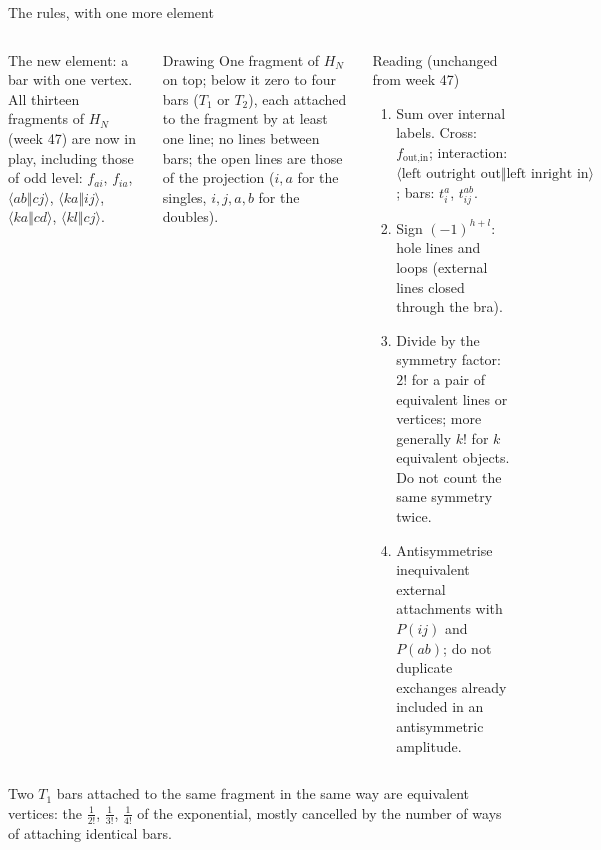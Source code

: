 \documentclass[aspectratio=169,10pt]{beamer}
\newcommand{\as}[4]{\langle #1#2\Vert #3#4\rangle}
\begin{document}
\begin{frame}[shrink=1]{The rules, with one more element}
\footnotesize
\begin{columns}[T]
\centering
{}
\hspace{1em}

\vspace{0.8em}
\raggedright\footnotesize The new element: a bar with one vertex. All thirteen fragments of $H_N$ (week 47) are now in play, including those of odd level: $f_{ai}$, $f_{ia}$, $\as abcj$, $\as kaij$, $\as kacd$, $\as klcj$.
\begin{block}{Drawing}
One fragment of $H_N$ on top; below it zero to four bars ($T_1$ or $T_2$), each attached to the fragment by at least one line; no lines between bars; the open lines are those of the projection ($i,a$ for the singles, $i,j,a,b$ for the doubles).
\end{block}
\begin{block}{Reading (unchanged from week 47)}
\begin{enumerate}
\item Sum over internal labels. Cross: $f_{\text{out},\text{in}}$; interaction: $\as{\text{left out}}{\text{right out}}{\text{left in}}{\text{right in}}$; bars: $t_i^a$, $t_{ij}^{ab}$.
\item Sign $(-1)^{h+l}$: hole lines and loops (external lines closed through the bra).
\item Divide by the symmetry factor: $2!$ for a pair of equivalent lines or vertices; more generally $k!$ for $k$ equivalent objects. Do not count the same symmetry twice.
\item Antisymmetrise inequivalent external attachments with $P(ij)$ and $P(ab)$; do not duplicate exchanges already included in an antisymmetric amplitude.
\end{enumerate}
\end{block}
\end{columns}
\vspace{0.4em}
Two $T_1$ bars attached to the same fragment in the same way are equivalent vertices: the $\tfrac1{2!}$, $\tfrac1{3!}$, $\tfrac1{4!}$ of the exponential, mostly cancelled by the number of ways of attaching identical bars.
\end{frame}
\end{document}
